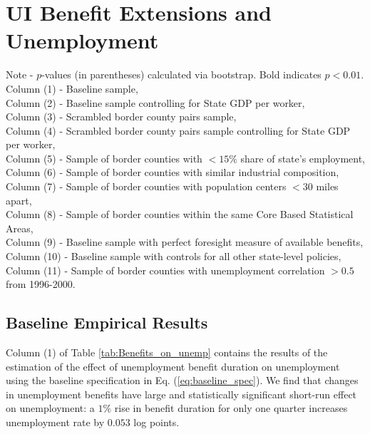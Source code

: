 \documentclass[12pt]{article}
\newcommand{\1}{\mathbf{1}}
\begin{document}
\section{UI Benefit Extensions and Unemployment}
\label{sec:benefits_and_unemployment}

\begin{table}[t]
  \centering
   \caption{Unemployment Benefit Extensions and Unemployment}\label{tab:Benefits_on_unemp}
\footnotesize

\parbox{16.5cm}{\noindent Note - $p$-values (in parentheses) calculated via bootstrap. Bold indicates $p<0.01$.\\
Column (1) - Baseline sample,\\
Column (2) - Baseline sample controlling for State GDP per worker,\\
Column (3) - Scrambled border county pairs sample,\\
Column (4) - Scrambled border county pairs sample controlling for State GDP per worker,\\
Column (5) - Sample of border counties with  $<15\%$ share of state's employment,\\
Column (6) - Sample of border counties with similar industrial composition,\\
Column (7) - Sample of border counties with population centers $<30$ miles apart,\\
Column (8) - Sample of border counties within the same Core Based Statistical Areas,\\
Column (9) - Baseline sample with perfect foresight measure of available benefits,\\
Column (10) - Baseline sample with controls for all other state-level policies, \\
Column (11) - Sample of border counties with unemployment correlation $>0.5$ from 1996-2000.
}
\vspace{-0.0cm}
\end{table}




\subsection{Baseline Empirical Results}
\label{sec:baseline_results}
Column (1) of Table \ref{tab:Benefits_on_unemp} contains the results of the estimation of the effect of unemployment benefit duration on unemployment using the baseline specification in Eq. (\ref{eq:baseline_spec}). We find that changes in unemployment benefits have large and statistically significant short-run effect on unemployment: a $1\%$ rise in benefit duration for only one quarter increases unemployment rate by $0.053$ log points.
\end{document}
